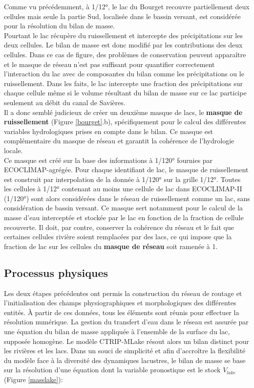 \noindent Comme vu précédemment, à 1/12°, le lac du Bourget recouvre partiellement deux cellules mais seule la partie Sud, localisée dans le bassin versant, est considérée pour la résolution du bilan de masse.\\
Pourtant le lac récupère du ruissellement et intercepte des précipitations sur les deux cellules. Le bilan de masse est donc modifié par les contributions des deux cellules. Dans ce cas de figure, des problèmes de conservation peuvent apparaître et le masque de réseau n'est pas suffisant pour quantifier correctement l'interaction du lac avec de composantes du bilan comme les précipitations ou le ruissellement. Dans les faits, le lac intercepte une fraction des précipitations sur chaque cellule même si le volume résultant du bilan de masse sur ce lac participe seulement au débit du canal de Savières. \\

Il a donc semblé judicieux de créer un deuxième masque de lacs, le \textbf{masque de ruissellement} (Figure \ref{bourget}.b), spécifiquement pour le calcul des différentes variables hydrologiques prises en compte dans le bilan. Ce masque est complémentaire du masque de réseau et garantit la cohérence de l'hydrologie locale. \\

Ce masque est créé sur la base des informations à 1/120° fournies par ECOCLIMAP-agrégée. Pour chaque identifiant de lac, le masque de ruissellement est construit par interpolation de la donnée à 1/120° sur la grille 1/12°. Toutes les cellules à 1/12° contenant au moins une cellule de lac dans ECOCLIMAP-II (1/120°) sont alors considérées dans le réseau de ruissellement comme un lac, sans considération de bassin versant. Ce masque sert notamment pour le calcul de la masse d'eau interceptée et stockée par le lac en fonction de la fraction de cellule recouverte. Il doit, par contre, conserver la cohérence du réseau et le fait que certaines cellules rivière soient remplacées par des lacs, ce qui impose que la fraction de lac sur les cellules du \textbf{masque de réseau} soit ramenée à 1.\\

\subsection{{\selectfont Processus physiques}}
\label{sec:routines}

Les deux étapes précédentes ont permis la construction du réseau de routage et l'initialisation des champs physiographiques et morphologiques des différentes entités. À partir de ces données, tous les éléments sont réunis pour effectuer la résolution numérique. La gestion du transfert d'eau dans le réseau est assurée par une équation du bilan de masse appliquée à l'ensemble de la surface du lac, supposée homogène. Le modèle CTRIP-MLake résout alors un bilan distinct pour les rivières et les lacs. Dans un souci de simplicité et afin d'accroître la flexibilité du modèle face à la diversité des dynamiques lacustres, le bilan de masse se base sur la résolution d'une équation dont la variable pronostique est le stock $V_{lake}$ (Figure \ref{masslake}):

